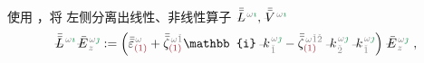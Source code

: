 使用 ，将  左侧分离出线性、非线性算子 $\Xint{\mathcolor{gray}{-}}{30}{\bar{\bar{L}}}^{\;\! \mathcolor{gray}{\omega} \textcolor{ForestGreen}{\imath}}, \Xint{\mathcolor{gray}{-}}{21}{\bar{\bar{V}}}^{\;\! \mathcolor{gray}{\omega} \textcolor{ForestGreen}{\imath}}$
\begin{subequations}
	\abovedisplayskip=-5pt
\begin{align}
	\Xint{\mathcolor{gray}{-}}{32}{\bar{\bar{L}}}^{\;\! \mathcolor{gray}{\omega} \textcolor{ForestGreen}{\imath}} \Xint{\mathcolor{gray}{-}}{295}{\bar{E}}^{\;\!\mathcolor{gray}{\omega} \textcolor{ForestGreen}{\jmath}}_{\;\! \mathcolor{gray}{z}} &:= \left( \bar{\bar{\varepsilon}}^{\;\! \mathcolor{gray}{\omega}}_{\textcolor{Maroon}{(1)}} + \bar{\bar{\zeta}}^{\;\! \mathcolor{gray}{\omega} \mathcolor{gray}{\check{1}}}_{\textcolor{Maroon}{(1)}} \mathbb{i} \Xint{\begin{smallmatrix} ~ \\ {}^{}_{\mathcolor{gray}{-}} \\ ~ \end{smallmatrix}}{15}{k}_{\;\! \mathcolor{gray}{\check{1}}}^{\;\! \mathcolor{gray}{\omega} \textcolor{ForestGreen}{\jmath}} - \bar{\bar{\zeta}}^{\;\! \mathcolor{gray}{\omega} \mathcolor{gray}{\check{1} \check{2}}}_{\textcolor{Maroon}{(1)}} \Xint{\begin{smallmatrix} ~ \\ {}^{}_{\mathcolor{gray}{-}} \\ ~ \end{smallmatrix}}{15}{k}_{\;\! \mathcolor{gray}{\check{2}}}^{\;\! \mathcolor{gray}{\omega} \textcolor{ForestGreen}{\jmath}} \Xint{\begin{smallmatrix} ~ \\ {}^{}_{\mathcolor{gray}{-}} \\ ~ \end{smallmatrix}}{15}{k}_{\;\! \mathcolor{gray}{\check{1}}}^{\;\! \mathcolor{gray}{\omega} \textcolor{ForestGreen}{\jmath}} \right) \Xint{\mathcolor{gray}{-}}{295}{\bar{E}}^{\;\!\mathcolor{gray}{\omega} \textcolor{ForestGreen}{\jmath}}_{\;\! \mathcolor{gray}{z}} ~, \label{eq:plane_wave_basis_eq-left_L} \\

\end{align}
\end{subequations}
